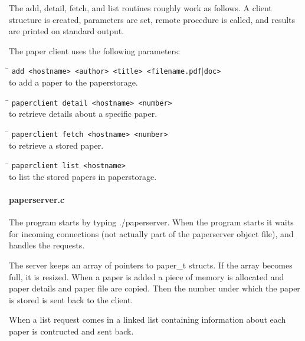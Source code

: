 \documentclass[a4paper,10pt]{article}
\begin{document}
The add, detail, fetch, and list routines roughly work as follows. A client structure is created, parameters are set, remote procedure is called, and results are printed on standard output.

The paper client uses the following parameters:

\begin{tabbing}
\hspace{20pt}\=\kill
 \> \texttt{add <hostname> <author> <title> <filename.}{\texttt{pdf$\vert$doc}}\texttt{>} \\
 \> to add a paper to the paperstorage.
\end{tabbing}

\begin{tabbing}
\hspace{20pt}\=\kill
 \> \texttt{paperclient detail <hostname> <number>} \\
 \> to retrieve details about a specific paper.
\end{tabbing}

\begin{tabbing}
\hspace{20pt}\=\kill
 \> \texttt{paperclient fetch <hostname> <number>} \\
 \> to retrieve a stored paper.
\end{tabbing}

\begin{tabbing}
\hspace{20pt}\=\kill
 \> \texttt{paperclient list <hostname>} \\
 \> to list the stored papers in paperstorage.
\end{tabbing}

\paragraph{paperserver.c}
The program starts by typing ./paperserver. When the program starts it waits for incoming connections (not actually part of the paperserver object file), and handles the requests.

The server keeps an array of pointers to paper\_t structs. If the array becomes full, it is resized. When a paper is added a piece of memory is allocated and paper details and paper file are copied. Then the number under which the paper is stored is sent back to the client.

When a list request comes in a linked list containing information about each paper is contructed and sent back.
\end{document}
